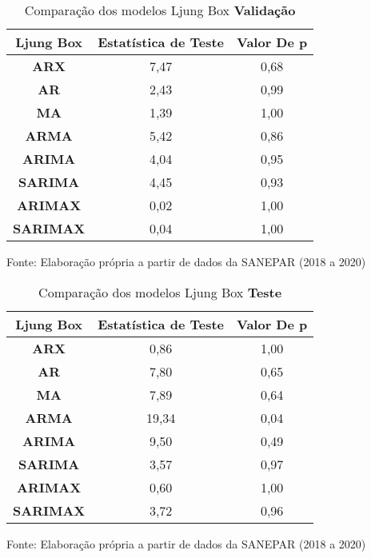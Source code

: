 \begin{table}[H]
	\centering
	\caption{Comparação dos modelos Ljung Box \textbf{Validação} }\label{tb:lbvld}
	\begin{tabular}{@{}ccc@{}}
		\toprule
		\textbf{Ljung Box} & \textbf{Estatística de Teste} & \textbf{Valor De p} \\ \midrule
\textbf{ARX}       & 7,47                          & 0,68                \\
\textbf{AR}        & 2,43                          & 0,99                \\
\textbf{MA}        & 1,39                          & 1,00                \\
\textbf{ARMA}      & 5,42                          & 0,86                \\
\textbf{ARIMA}     & 4,04                          & 0,95                \\
\textbf{SARIMA}    & 4,45                          & 0,93                \\
\textbf{ARIMAX}    & 0,02                          & 1,00                \\
\textbf{SARIMAX}   & 0,04                          & 1,00                \\ \bottomrule
	\end{tabular}

Fonte: Elaboração própria a partir de dados da SANEPAR (2018 a 2020)
\end{table}

\begin{table}[H]
	\centering
	\caption{Comparação dos modelos Ljung Box \textbf{Teste} }\label{tb:lbtst}
	\begin{tabular}{@{}ccc@{}}
		\toprule
		\textbf{Ljung Box} & \textbf{Estatística de Teste} & \textbf{Valor De p} \\ \midrule
\textbf{ARX}       & 0,86                          & 1,00                \\
\textbf{AR}        & 7,80                          & 0,65                \\
\textbf{MA}        & 7,89                          & 0,64                \\
\textbf{ARMA}      & 19,34                         & 0,04                \\
\textbf{ARIMA}     & 9,50                          & 0,49                \\
\textbf{SARIMA}    & 3,57                          & 0,97                \\
\textbf{ARIMAX}    & 0,60                          & 1,00                \\
\textbf{SARIMAX}   & 3,72                          & 0,96                \\ \bottomrule
	\end{tabular}
	
	Fonte: Elaboração própria a partir de dados da SANEPAR (2018 a 2020)
\end{table}

